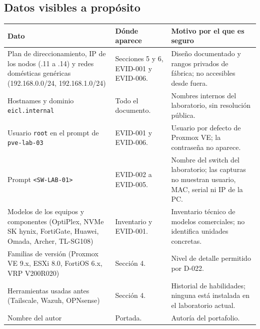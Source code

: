 \documentclass[11pt,a4paper]{article}
\begin{document}
\subsection{Datos visibles a propósito}
{\small
\begin{longtable}{L{3.4cm} L{6.0cm} L{5.6cm}}
  \toprule
  \textbf{Dato} & \textbf{Dónde aparece} & \textbf{Motivo por el que es seguro}\\
  \midrule
  \endhead
  Plan de direccionamiento, IP de los nodos (.11 a .14) y redes domésticas genéricas (192.168.0.0/24, 192.168.1.0/24) & Secciones 5 y 6, EVID-001 y EVID-006. & Diseño documentado y rangos privados de fábrica; no accesibles desde fuera.\\
  Hostnames y dominio \texttt{eicl.internal} & Todo el documento. & Nombres internos del laboratorio, sin resolución pública.\\
  Usuario \texttt{root} en el prompt de \texttt{pve-lab-03} & EVID-001 y EVID-006. & Usuario por defecto de Proxmox VE; la contraseña no aparece.\\
  Prompt \texttt{<SW-LAB-01>} & EVID-002 a EVID-005. & Nombre del switch del laboratorio; las capturas no muestran usuario, MAC, serial ni IP de la PC.\\
  Modelos de los equipos y componentes (OptiPlex, NVMe SK hynix, FortiGate, Huawei, Omada, Archer, TL-SG108) & Inventario y EVID-001. & Inventario técnico de modelos comerciales; no identifica unidades concretas.\\
  Familias de versión (Proxmox VE 9.x, ESXi 8.0, FortiOS 6.x, VRP V200R020) & Sección 4. & Nivel de detalle permitido por D-022.\\
  Herramientas usadas antes (Tailscale, Wazuh, OPNsense) & Sección 4. & Historial de habilidades; ninguna está instalada en el laboratorio actual.\\
  Nombre del autor & Portada. & Autoría del portafolio.\\
  \bottomrule
\end{longtable}
}
\end{document}
